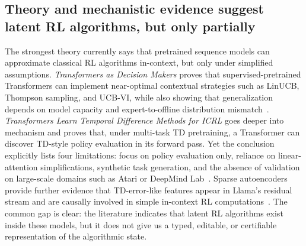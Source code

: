 \documentclass[10pt,twocolumn,letterpaper]{article}
\begin{document}
\subsection{Theory and mechanistic evidence suggest latent RL algorithms, but only partially}
The strongest theory currently says that pretrained sequence models can approximate classical RL algorithms in-context, but only under simplified assumptions. \emph{Transformers as Decision Makers} proves that supervised-pretrained Transformers can implement near-optimal contextual strategies such as LinUCB, Thompson sampling, and UCB-VI, while also showing that generalization depends on model capacity and expert-to-offline distribution mismatch~\cite{lin2023decisionmakers}. \emph{Transformers Learn Temporal Difference Methods for ICRL} goes deeper into mechanism and proves that, under multi-task TD pretraining, a Transformer can discover TD-style policy evaluation in its forward pass. Yet the conclusion explicitly lists four limitations: focus on policy evaluation only, reliance on linear-attention simplifications, synthetic task generation, and the absence of validation on large-scale domains such as Atari or DeepMind Lab~\cite{wang2024td}. Sparse autoencoders provide further evidence that TD-error-like features appear in Llama's residual stream and are causally involved in simple in-context RL computations~\cite{demircan2024sae}. The common gap is clear: the literature indicates that latent RL algorithms exist inside these models, but it does not give us a typed, editable, or certifiable representation of the algorithmic state.
\end{document}
